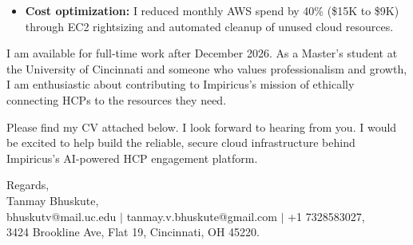\documentclass[11pt]{letter}
\begin{document}
\begin{letter}{}
\begin{itemize}[leftmargin=*, itemsep=0.45em]
    \item \textbf{Cost optimization:} I reduced monthly AWS spend by 40\% (\$15K to \$9K) through EC2 rightsizing and automated cleanup of unused cloud resources.
\end{itemize}

I am available for full-time work after December 2026. As a Master's student at the University of Cincinnati and someone who values professionalism and growth, I am enthusiastic about contributing to Impiricus's mission of ethically connecting HCPs to the resources they need.

Please find my CV attached below. I look forward to hearing from you. I would be excited to help build the reliable, secure cloud infrastructure behind Impiricus's AI-powered HCP engagement platform.

{\setlength{\parskip}{0pt}
Regards,\\
Tanmay Bhuskute,\\
bhuskutv@mail.uc.edu $\mid$ tanmay.v.bhuskute@gmail.com $\mid$ +1 7328583027,\\
3424 Brookline Ave, Flat 19, Cincinnati, OH 45220.
}

\end{letter}
\end{document}
